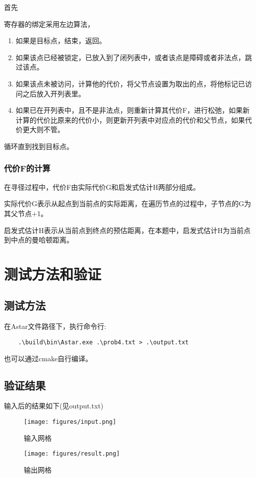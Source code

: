 \documentclass[12pt,hyperref,a4paper,UTF8]{ctexart}
\begin{document}
首先


寄存器的绑定采用左边算法，

\begin{enumerate}
\item 如果是目标点，结束，返回。
\item 如果该点已经被锁定，已放入到了闭列表中，或者该点是障碍或者非法点，跳过该点。
\item 如果该点未被访问，计算他的代价，将父节点设置为取出的点，将他标记已访问之后放入开列表里。
\item 如果已在开列表中，且不是非法点，则重新计算其代价F，进行松弛，如果新计算的代价比原来的代价小，则更新开列表中对应点的代价和父节点，如果代价更大则不管。
\end{enumerate}

循环直到找到目标点。

\subsubsection{代价F的计算}

在寻径过程中，代价F由实际代价G和启发式估计H两部分组成。

实际代价G表示从起点到当前点的实际距离，在遍历节点的过程中，子节点的G为其父节点+1。

启发式估计H表示从当前点到终点的预估距离，在本题中，启发式估计H为当前点到中点的曼哈顿距离。

\section{测试方法和验证}

\subsection{测试方法}

在Astar文件路径下，执行命令行:

\begin{verbatim}
    .\build\bin\Astar.exe .\prob4.txt > .\output.txt
\end{verbatim}
    
也可以通过cmake自行编译。

\subsection{验证结果}

输入后的结果如下(见output.txt)

\begin{figure}[htbp]
    \centering
    \begin{minipage}[b]{0.45\textwidth}
        \centering
        \texttt{[image: figures/input.png]}
        \caption{输入网格}
        \label{fig:image1}
    \end{minipage}
    \hfill
    \begin{minipage}[b]{0.45\textwidth}
        \centering
        \texttt{[image: figures/result.png]}
        \caption{输出网格}
        \label{fig:image2}
    \end{minipage}
\end{figure}
\end{document}
